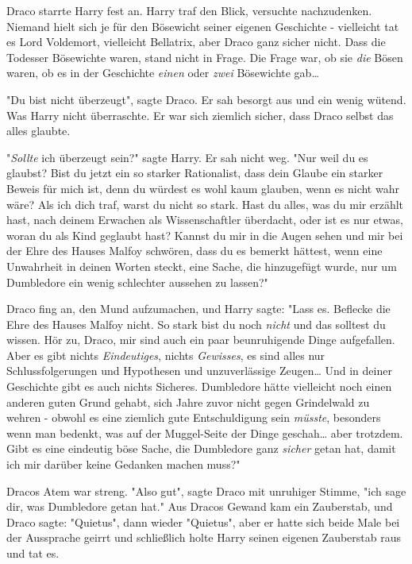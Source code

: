 {Draco starrte Harry fest an. Harry traf den Blick, versuchte nachzudenken. Niemand hielt sich je für den Bösewicht seiner eigenen Geschichte - vielleicht tat es Lord Voldemort, vielleicht Bellatrix, aber Draco ganz sicher nicht. Dass die Todesser Bösewichte waren, stand nicht in Frage. Die Frage war, ob sie \emph{die} Bösen waren, ob es in der Geschichte \emph{einen} oder \emph{zwei} Bösewichte gab…

"Du bist nicht überzeugt", sagte Draco. Er sah besorgt aus und ein wenig wütend. Was Harry nicht überraschte. Er war sich ziemlich sicher, dass Draco selbst das alles glaubte.

"\emph{Sollte} ich überzeugt sein?" sagte Harry. Er sah nicht weg. "Nur weil du es glaubst? Bist du jetzt ein so starker Rationalist, dass dein Glaube ein starker Beweis für mich ist, denn du würdest es wohl kaum glauben, wenn es nicht wahr wäre? Als ich dich traf, warst du nicht so stark. Hast du alles, was du mir erzählt hast, nach deinem Erwachen als Wissenschaftler überdacht, oder ist es nur etwas, woran du als Kind geglaubt hast? Kannst du mir in die Augen sehen und mir bei der Ehre des Hauses Malfoy schwören, dass du es bemerkt hättest, wenn eine Unwahrheit in deinen Worten steckt, eine Sache, die hinzugefügt wurde, nur um Dumbledore ein wenig schlechter aussehen zu lassen?"

Draco fing an, den Mund aufzumachen, und Harry sagte: "Lass es. Beflecke die Ehre des Hauses Malfoy nicht. So stark bist du noch \emph{nicht} und das solltest du wissen. Hör zu, Draco, mir sind auch ein paar beunruhigende Dinge aufgefallen. Aber es gibt nichts \emph{Eindeutiges}, nichts \emph{Gewisses}, es sind alles nur Schlussfolgerungen und Hypothesen und unzuverlässige Zeugen… Und in deiner Geschichte gibt es auch nichts Sicheres. Dumbledore hätte vielleicht noch einen anderen guten Grund gehabt, sich Jahre zuvor nicht gegen Grindelwald zu wehren - obwohl es eine ziemlich gute Entschuldigung sein \emph{müsste}, besonders wenn man bedenkt, was auf der Muggel-Seite der Dinge geschah… aber trotzdem. Gibt es eine eindeutig böse Sache, die Dumbledore ganz \emph{sicher} getan hat, damit ich mir darüber keine Gedanken machen muss?"

Dracos Atem war streng. "Also gut", sagte Draco mit unruhiger Stimme, "ich sage dir, was Dumbledore getan hat." Aus Dracos Gewand kam ein Zauberstab, und Draco sagte: "Quietus", dann wieder "Quietus", aber er hatte sich beide Male bei der Aussprache geirrt und schließlich holte Harry seinen eigenen Zauberstab raus und tat es.

}
